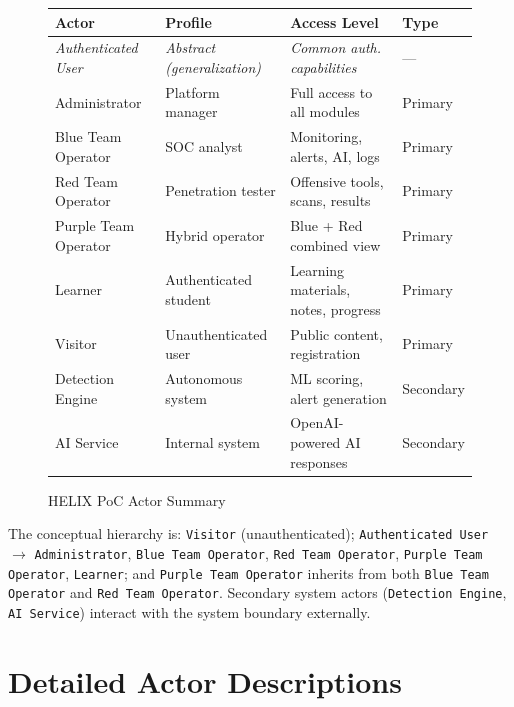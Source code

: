 \documentclass[12pt,a4paper]{report}
\begin{document}
	\begin{figure}[H]
		\centering
		\begin{sectionbox}
			\begin{tabular}{C{3.2cm} C{4.0cm} C{2.8cm} C{2.2cm}}
				\toprule
				\textbf{Actor} & \textbf{Profile} & \textbf{Access Level} & \textbf{Type} \\
				\midrule
				\textit{Authenticated User} & \textit{Abstract (generalization)} & \textit{Common auth. capabilities} & --- \\
				\midrule
				Administrator & Platform manager & Full access to all modules & Primary \\
				Blue Team Operator & SOC analyst & Monitoring, alerts, AI, logs & Primary \\
				Red Team Operator & Penetration tester & Offensive tools, scans, results & Primary \\
				Purple Team Operator & Hybrid operator & Blue + Red combined view & Primary \\
				Learner & Authenticated student & Learning materials, notes, progress & Primary \\
				Visitor & Unauthenticated user & Public content, registration & Primary \\
			Detection Engine & Autonomous system & ML scoring, alert generation & Secondary \\
			AI Service & Internal system & OpenAI-powered AI responses & Secondary \\
			\bottomrule
			\end{tabular}
		\end{sectionbox}
		\caption{HELIX PoC Actor Summary}
	\end{figure}
	
	The conceptual hierarchy is:
	\texttt{Visitor} (unauthenticated); \texttt{Authenticated User} $\rightarrow$ \texttt{Administrator},
	\texttt{Blue Team Operator}, \texttt{Red Team Operator}, \texttt{Purple Team Operator}, \texttt{Learner};
	and \texttt{Purple Team Operator} inherits from both \texttt{Blue Team Operator} and \texttt{Red Team Operator}.
	Secondary system actors (\texttt{Detection Engine}, \texttt{AI Service}) interact with the system boundary externally.
	
	\section{Detailed Actor Descriptions}
	
\end{document}
